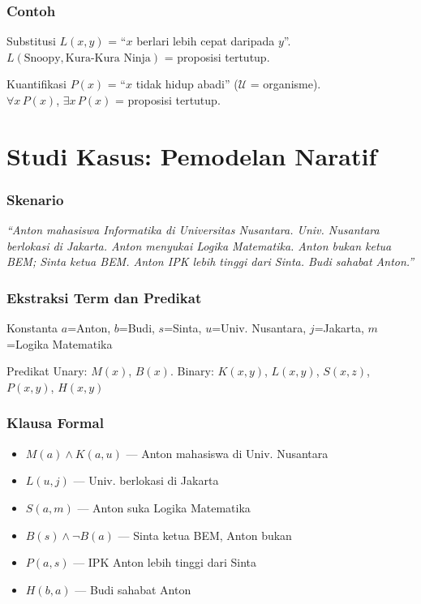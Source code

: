 \documentclass[handout]{beamer}
\theoremstyle{definition}
\theoremstyle{example}
\begin{document}
\begin{frame}
\frametitle{Contoh}
\begin{block}{Substitusi}
$L(x,y)$ = ``$x$ berlari lebih cepat daripada $y$''.\\
$L(\text{Snoopy}, \text{Kura-Kura Ninja})$ = proposisi tertutup.
\end{block}
\begin{block}{Kuantifikasi}
$P(x)$ = ``$x$ tidak hidup abadi'' ($\mathcal{U}$ = organisme).\\
$\forall x\, P(x)$, $\exists x\, P(x)$ = proposisi tertutup.
\end{block}
\end{frame}

\section{Studi Kasus: Pemodelan Naratif}

\begin{frame}
\frametitle{Skenario}
\textit{``Anton mahasiswa Informatika di Universitas Nusantara. Univ. Nusantara berlokasi di Jakarta. Anton menyukai Logika Matematika. Anton bukan ketua BEM; Sinta ketua BEM. Anton IPK lebih tinggi dari Sinta. Budi sahabat Anton.''}
\end{frame}

\begin{frame}
\frametitle{Ekstraksi Term dan Predikat}
\begin{block}{Konstanta}
$a$=Anton, $b$=Budi, $s$=Sinta, $u$=Univ. Nusantara, $j$=Jakarta, $m$=Logika Matematika
\end{block}
\begin{block}{Predikat}
Unary: $M(x)$, $B(x)$. Binary: $K(x,y)$, $L(x,y)$, $S(x,z)$, $P(x,y)$, $H(x,y)$
\end{block}
\end{frame}

\begin{frame}
\frametitle{Klausa Formal}
\begin{itemize}
  \item $M(a) \wedge K(a,u)$ --- Anton mahasiswa di Univ. Nusantara
  \item $L(u,j)$ --- Univ. berlokasi di Jakarta
  \item $S(a,m)$ --- Anton suka Logika Matematika
  \item $B(s) \wedge \neg B(a)$ --- Sinta ketua BEM, Anton bukan
  \item $P(a,s)$ --- IPK Anton lebih tinggi dari Sinta
  \item $H(b,a)$ --- Budi sahabat Anton
\end{itemize}
\end{frame}
\end{document}
